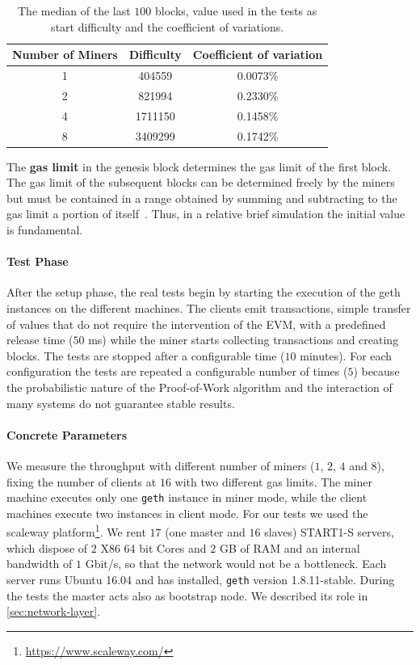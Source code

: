 \begin{table}
    \begin{center}
        \begin{tabular}{c | c | c}
            Number of Miners & Difficulty & Coefficient of variation \\
            \hline
            1 &  404559 & 0.0073\% \\
            2 &  821994 & 0.2330\%\\
            4 & 1711150 & 0.1458\%\\
            8 & 3409299 & 0.1742\%\\
        \end{tabular}
        \caption{The median of the last $100$ blocks, value used in the tests as
            start difficulty and the coefficient of variations.}
        \label{table:start-difficulty}
    \end{center}
\end{table}


The \textbf{gas limit} in the genesis block determines the gas limit of the
first block. The gas limit of the subsequent blocks can be determined freely by
the miners but must be contained in a range obtained by summing and subtracting
to the gas limit a portion of itself~\cite{wood2018ethereum}. Thus, in a
relative brief simulation the initial value is fundamental.

\paragraph{Test Phase}
After the setup phase, the real tests begin by starting the execution of the 
geth instances on the different machines. The clients emit transactions, simple
transfer of values that do not require the intervention of the EVM, with a 
predefined release time ($50$ ms) while the miner starts collecting 
transactions and creating blocks. The tests are stopped after a configurable 
time ($10$ minutes). For each configuration the tests are repeated a 
configurable number of times ($5$) because the probabilistic nature of the 
Proof-of-Work algorithm and the interaction of many systems do not guarantee 
stable results.


\paragraph{Concrete Parameters}
We measure the throughput with different number of miners ($1$, $2$, $4$ and 
$8$), fixing the number of clients at $16$ with two different gas limits. 
The miner machine executes only one \texttt{geth} instance in miner mode, while 
the client machines execute two instances in client mode. For our tests we used 
the scaleway
platform\footnote{\url{https://www.scaleway.com/}}. We rent $17$ (one master
and $16$ slaves) START1-S servers, which dispose of $2$ X86 64 bit Cores and 
$2$ GB of RAM and an internal bandwidth of $1$ Gbit/s, so that the network 
would not be a bottleneck. Each server runs Ubuntu 16.04 and has installed, 
\texttt{geth} version 1.8.11-stable. During the tests the master acts also as 
bootstrap node. We described its role in \autoref{sec:network-layer}. 

